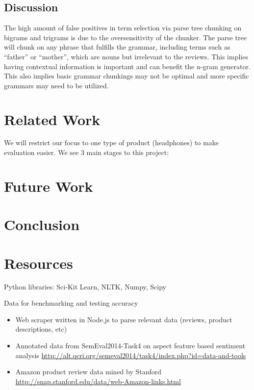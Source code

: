 \documentclass{article}
\begin{document}
\subsection{Discussion}
The high amount of false positives in term selection via parse tree chunking on bigrams and trigrams is due to the oversensitivity of the chunker. The parse tree will chunk on any phrase that fulfills the grammar, including terms such as “father” or “mother”, which are nouns but irrelevant to the reviews. This implies having contextual information is important and can benefit the n-gram generator. This also implies basic grammar chunkings may not be optimal and more specific grammars may need to be utilized.
\section{Related Work}
We will restrict our focus to one type of product (headphones) to make evaluation easier. We see 3 main stages to this project:





\section{Future Work}
\section{Conclusion}
\section{Resources}

Python libraries: Sci-Kit Learn, NLTK, Numpy, Scipy

Data for benchmarking and testing accuracy

\begin{itemize}
\item Web scraper written in Node.js to parse relevant data (reviews, product descriptions, etc)
\newline 

\item Annotated data from SemEval2014-Task4 on aspect feature based sentiment analysis
\newline
\url{http://alt.qcri.org/semeval2014/task4/index.php?id=data-and-tools}

\item Amazon product review data mined by Stanford
\newline
\url{http://snap.stanford.edu/data/web-Amazon-links.html}
\end{itemize}
\end{document}
